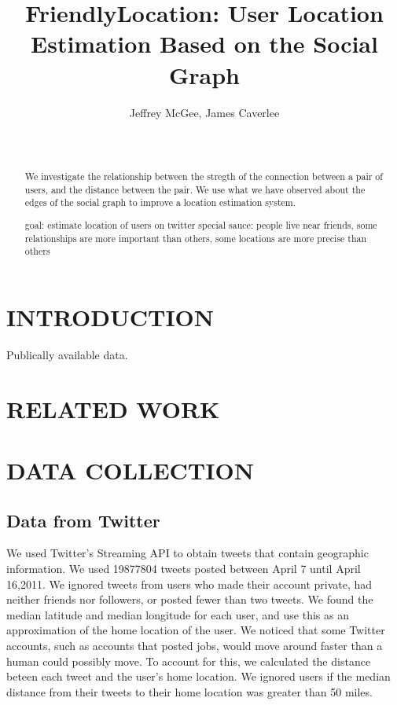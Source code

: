 \documentclass{sig-alternate}
\title{FriendlyLocation: User Location Estimation Based on the Social Graph}
\author{
    \alignauthor Jeffrey McGee, James Caverlee\\
    \affaddr{Department of Computer Science and Engineering, Texas A\&M
    University} \\
    \affaddr{ College Station, TX 77845 USA} \\
    \email{jeffamcgee@tamu.edu, caverlee@cse.tamu.edu}
}
\begin{document}
\maketitle
\begin{abstract}
We investigate the relationship between the stregth of the connection between a pair of users, and the distance between the pair.
We use what we have observed about the edges of the social graph to improve a location estimation system.

goal: estimate location of users on twitter
special sauce: people live near friends, some relationships are more important than others, some locations are more precise than others
\end{abstract}




\section{INTRODUCTION}

Publically available data.



\section{RELATED WORK}


\section{DATA COLLECTION}


\subsection{Data from Twitter}
We used Twitter's Streaming API to obtain tweets that contain geographic information.
We used 19877804 tweets posted between April 7 until April 16,2011.
We ignored tweets from users who made their account private, had neither friends nor followers, or posted fewer than two tweets.
We found the median latitude and median longitude for each user, and use this as an approximation of the home location of the user.
We noticed that some Twitter accounts, such as accounts that posted jobs, would move around faster than a human could possibly move. To account for this, we calculated the distance beteen each tweet and the user's home location. We ignored users if the median distance from their tweets to their home location was greater than 50 miles.
\end{document}
